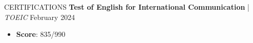 \begin{rSection}{CERTIFICATIONS}
    \textbf{Test of English for International Communication} | \textit{ TOEIC } \hfill {February 2024}
    \begin{itemize}
        \itemsep 0pt {} \vspace{0.5em}
        \item \textbf{Score}: 835/990
    \end{itemize}
\end{rSection}
